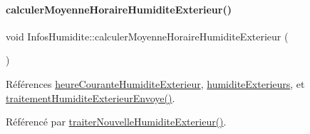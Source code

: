 \paragraph{\texorpdfstring{calculer\+Moyenne\+Horaire\+Humidite\+Exterieur()}{calculerMoyenneHoraireHumiditeExterieur()}}
{\footnotesize\ttfamily void Infos\+Humidite\+::calculer\+Moyenne\+Horaire\+Humidite\+Exterieur (\begin{DoxyParamCaption}{ }\end{DoxyParamCaption})\hspace{0.3cm}{\ttfamily [private]}}



Références \hyperlink{class_infos_humidite_ad7b450373a47ec831872872e0e5674ad}{heure\+Courante\+Humidite\+Exterieur}, \hyperlink{class_infos_humidite_a62d1331116ee1cf00cb8fa369a214c62}{humidite\+Exterieurs}, et \hyperlink{class_infos_humidite_abd0535dee74a4588232d282d0fe64829}{traitement\+Humidite\+Exterieur\+Envoye()}.



Référencé par \hyperlink{class_infos_humidite_a8d17fa3c7d15b1ff8130ae5d22702e5f}{traiter\+Nouvelle\+Humidite\+Exterieur()}.


